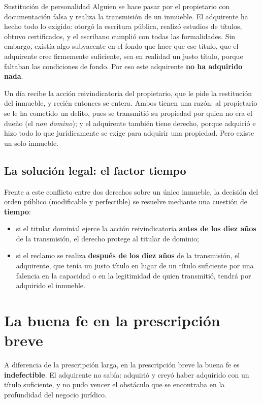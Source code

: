 \documentclass[12pt,oneside]{book}
\begin{document}
\begin{example}{Sustitución de personalidad}
Alguien se hace pasar por el propietario con documentación falsa y realiza la transmisión de un inmueble. El adquirente ha hecho todo lo exigido: otorgó la escritura pública, realizó estudios de títulos, obtuvo certificados, y el escribano cumplió con todas las formalidades. Sin embargo, existía algo subyacente en el fondo que hace que ese título, que el adquirente cree firmemente suficiente, sea en realidad un justo título, porque faltaban las condiciones de fondo. Por eso este adquirente \textbf{no ha adquirido nada}.

Un día recibe la acción reivindicatoria del propietario, que le pide la restitución del inmueble, y recién entonces se entera. Ambos tienen una razón: al propietario se le ha cometido un delito, pues se transmitió su propiedad por quien no era el dueño (el \textit{non domino}); y el adquirente también tiene derecho, porque adquirió e hizo todo lo que jurídicamente se exige para adquirir una propiedad. Pero existe un solo inmueble.
\end{example}

\subsection{La solución legal: el factor tiempo}

Frente a este conflicto entre dos derechos sobre un único inmueble, la decisión del orden público (modificable y perfectible) se resuelve mediante una cuestión de \textbf{tiempo}:

\begin{itemize}
    \item si el titular dominial ejerce la acción reivindicatoria \textbf{antes de los diez años} de la transmisión, el derecho protege al titular de dominio;
    \item si el reclamo se realiza \textbf{después de los diez años} de la transmisión, el adquirente, que tenía un justo título en lugar de un título suficiente por una falencia en la capacidad o en la legitimidad de quien transmitió, tendrá por adquirido el inmueble.
\end{itemize}

\section{La buena fe en la prescripción breve}

A diferencia de la prescripción larga, en la prescripción breve la buena fe es \textbf{indefectible}. El adquirente no sabía: adquirió y creyó haber adquirido con un título suficiente, y no pudo vencer el obstáculo que se encontraba en la profundidad del negocio jurídico.
\end{document}
